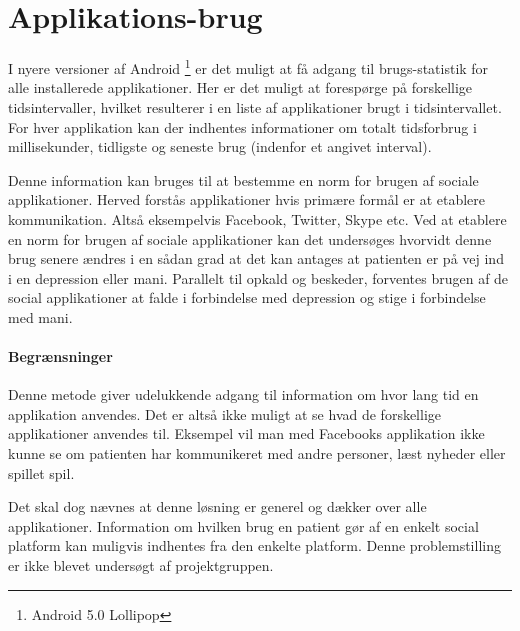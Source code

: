 \section{Applikations-brug}
I nyere versioner af Android \footnote{Android 5.0 Lollipop} er det muligt at få adgang til brugs-statistik for alle installerede applikationer.
Her er det muligt at forespørge på forskellige tidsintervaller, hvilket resulterer i en liste af applikationer brugt i tidsintervallet.
For hver applikation kan der indhentes informationer om totalt tidsforbrug i millisekunder, tidligste og seneste brug (indenfor et angivet interval).

Denne information kan bruges til at bestemme en norm for brugen af sociale applikationer.
Herved forstås applikationer hvis primære formål er at etablere kommunikation.
Altså eksempelvis Facebook, Twitter, Skype etc.
Ved at etablere en norm for brugen af sociale applikationer kan det undersøges hvorvidt denne brug senere ændres i en sådan grad at det kan antages at patienten er på vej ind i en depression eller mani.
Parallelt til opkald og beskeder, forventes brugen af de social applikationer at falde i forbindelse med depression og stige i forbindelse med mani.

\paragraph{Begrænsninger}
Denne metode giver udelukkende adgang til information om hvor lang tid en applikation anvendes.
Det er altså ikke muligt at se hvad de forskellige applikationer anvendes til.
Eksempel vil man med Facebooks applikation ikke kunne se om patienten har kommunikeret med andre personer, læst nyheder eller spillet spil.

Det skal dog nævnes at denne løsning er generel og dækker over alle applikationer.
Information om hvilken brug en patient gør af en enkelt social platform kan muligvis indhentes fra den enkelte platform.
Denne problemstilling er ikke blevet undersøgt af projektgruppen.